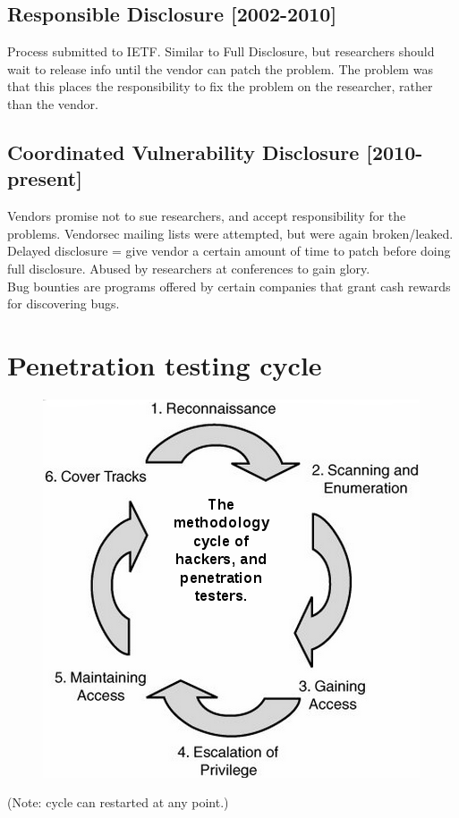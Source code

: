 \documentclass[letterpaper]{article}
\begin{document}
\subsection{Responsible Disclosure [2002-2010]}
Process submitted to IETF. Similar to Full Disclosure, but researchers should wait to release info until the vendor can patch the problem. The problem was that this places the  responsibility to fix the problem on the researcher, rather than the vendor.

\subsection{Coordinated Vulnerability Disclosure [2010-present]}
Vendors promise not to sue researchers, and accept responsibility for the problems. Vendorsec mailing lists were attempted, but were again broken/leaked.\\
Delayed disclosure = give vendor a certain amount of time to patch before doing full disclosure. Abused by researchers at conferences to gain glory.\\
Bug bounties are programs offered by certain companies that grant cash rewards for discovering bugs.

\section{Penetration testing cycle}
\begin{figure}[H]
\centering
\includegraphics[scale=0.71]{penetration_testing_cycle.png}
\end{figure}
(Note: cycle can restarted at any point.)
\end{document}
